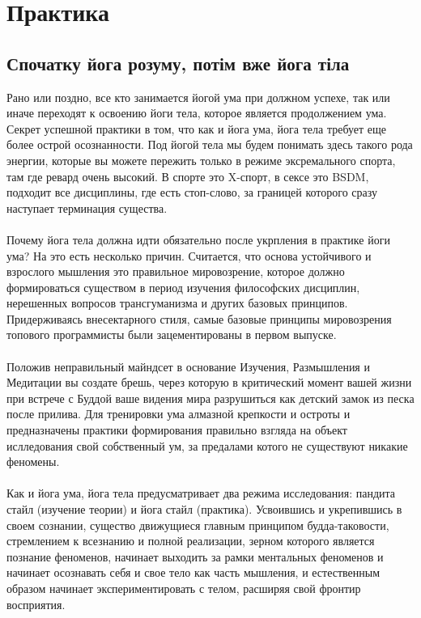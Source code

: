 \section{Практика}

\subsection{Спочатку йога розуму, потім вже йога тіла}

Рано или поздно, все кто занимается йогой ума при должном успехе, так или иначе переходят к освоению йоги тела, которое является продолжением ума. Секрет успешной практики в том, что как и йога ума, йога тела требует еще более острой осознанности. Под йогой тела мы будем понимать здесь такого рода энергии, которые вы можете пережить только в режиме эксремального спорта, там где ревард очень высокий. В спорте   это X-спорт, в сексе   это BSDM, подходит все дисциплины, где есть стоп-слово, за границей которого сразу наступает терминация существа.
\\
\\
Почему йога тела должна идти обязательно после укрпления в практике йоги ума? На это есть несколько причин. Считается, что основа устойчивого и взрослого мышления   это правильное мировозрение, которое должно формироваться существом в период изучения философских дисциплин, нерешенных вопросов трансгуманизма и других базовых принципов. Придерживаясь внесектарного стиля, самые базовые принципы мировозрения топового программисты были зацементированы в первом выпуске.
\\
\\
Положив неправильный майндсет в основание Изучения, Размышления и Медитации вы создате брешь, через которую в критический момент вашей жизни при встрече с Буддой ваше видения мира разрушиться как детский замок из песка после прилива. Для тренировки ума алмазной крепкости и остроты и предназначены практики формирования правильно взгляда на объект ислледования   свой собственный ум, за предалами котого не существуют никакие феномены.
\\
\\
Как и йога ума, йога тела предусматривает два режима исследования: пандита стайл (изучение теории) и йога стайл (практика). Усвоившись и укрепившись в своем сознании, существо движущиеся главным принципом будда-таковости, стремлением к всезнанию и полной реализации, зерном которого является познание феноменов, начинает выходить за рамки ментальных феноменов и начинает осознавать себя и свое тело как часть мышления, и естественным образом начинает экспериментировать с телом, расширяя свой фронтир восприятия.
